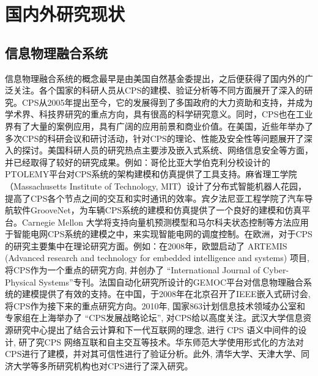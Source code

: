 \section{国内外研究现状}

\subsection{信息物理融合系统}
信息物理融合系统的概念最早是由美国自然基金委提出，之后便获得了国内外的广泛关注。各个国家的科研人员从CPS的建模、验证分析等不同方面展开了深入的研究。CPS从2005年提出至今，它的发展得到了多国政府的大力资助和支持，并成为学术界、科技界研究的重点方向，具有很高的科学研究意义。同时，CPS也在工业界有了大量的案例应用，具有广阔的应用前景和商业价值。在美国，近些年举办了多次CPS的科研会议和研讨活动，针对CPS的理论、性能及安全性等问题展开了深入的探讨。美国科研人员的研究热点主要涉及嵌入式系统、网络信息安全等方面，并已经取得了较好的研究成果。例如：哥伦比亚大学伯克利分校设计的PTOLEMY平台对CPS系统的架构建模和仿真提供了工具支持。麻省理工学院 （Massachusetts Institute of Technology, MIT）设计了分布式智能机器人花园，提高了CPS各个节点之间的交互和实时通讯的效率。宾夕法尼亚工程学院了汽车导航软件GrooveNet，为车辆CPS系统的建模和仿真提供了一个良好的建模和仿真平台。Carnegie Mellon 大学将支持向量机预测模型和马尔科夫状态控制等方法应用于智能电网CPS系统的建模之中，来实现智能电网的调度控制。在欧洲，对于CPS的研究主要集中在理论研究方面。例如：在2008年，欧盟启动了 ARTEMIS (Advanced research and technology for embedded intelligence and systems) 项目, 将CPS作为一个重点的研究方向, 并创办了 “International Journal of Cyber-Physical Systems”专刊。法国自动化研究所设计的GEMOC平台对信息物理融合系统的建模提供了有效的支持。在中国，于2008年在北京召开了IEEE嵌入式研讨会, 将CPS作为接下来的重点研究方向。2010年, 国家863计划信息技术领域办公室和专家组在上海举办了 “CPS发展战略论坛”, 对CPS给以高度关注。武汉大学信息资源研究中心提出了结合云计算和下一代互联网的理念, 进行 CPS 语义中间件的设计, 研了究CPS 网络互联和自主交互等技术。华东师范大学使用形式化的方法对CPS进行了建模，并对其可信性进行了验证分析。此外, 清华大学、天津大学、同济大学等多所研究机构也对CPS进行了深入研究。



